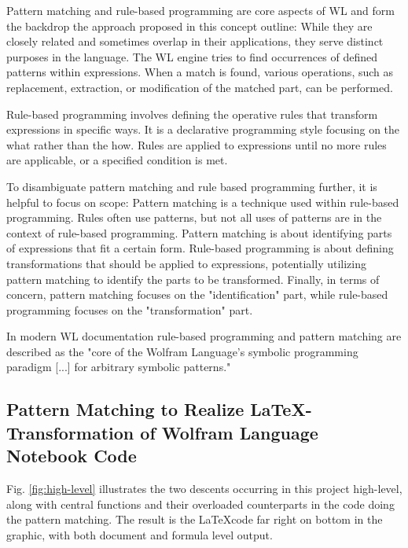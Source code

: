 Pattern matching and rule-based programming are core aspects of WL and form the backdrop the approach proposed in this concept outline: While they are closely related and sometimes overlap in their applications, they serve distinct purposes in the language. The WL engine tries to find occurrences of defined patterns within expressions. When a match is found, various operations, such as replacement, extraction, or modification of the matched part, can be performed.

Rule-based programming involves defining the operative rules that transform expressions in specific ways. It is a declarative programming style focusing on the what rather than the how. Rules are applied to expressions until no more rules are applicable, or a specified condition is met. 

To disambiguate pattern matching and rule based programming further, it is helpful to focus on scope: Pattern matching is a technique used within rule-based programming. Rules often use patterns, but not all uses of patterns are in the context of rule-based programming. Pattern matching is about identifying parts of expressions that fit a certain form. Rule-based programming is about defining transformations that should be applied to expressions, potentially utilizing pattern matching to identify the parts to be transformed. Finally, in terms of concern, pattern matching focuses on the "identification" part, while rule-based programming focuses on the "transformation" part. 

In modern WL documentation rule-based programming and pattern matching are described as the "core of the Wolfram Language's symbolic programming paradigm [...] for arbitrary symbolic patterns." \cite{wolfram_research_rules_nodate}

\subsection{Pattern Matching to Realize \LaTeX-Transformation of Wolfram Language Notebook Code}

Fig. \ref{fig:high-level} illustrates the two descents occurring in this project high-level, along with central functions and their overloaded counterparts in the code doing the pattern matching. The result is the \LaTeX code far right on bottom in the graphic, with both document and formula level output.

